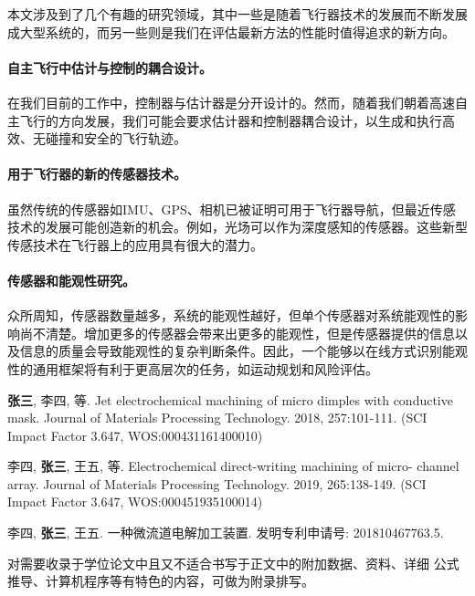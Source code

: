 \documentclass[
  type=master
]{gdutthesis}
\begin{document}
本文涉及到了几个有趣的研究领域，其中一些是随着飞行器技术的发展而不断发展成大型系统的，而另一些则是我们在评估最新方法的性能时值得追求的新方向。
\paragraph{自主飞行中估计与控制的耦合设计。}
在我们目前的工作中，控制器与估计器是分开设计的。然而，随着我们朝着高速自主飞行的方向发展，我们可能会要求估计器和控制器耦合设计，以生成和执行高效、无碰撞和安全的飞行轨迹。
\paragraph{用于飞行器的新的传感器技术。}
虽然传统的传感器如IMU、GPS、相机已被证明可用于飞行器导航，但最近传感技术的发展可能创造新的机会。例如，光场可以作为深度感知的传感器。这些新型传感技术在飞行器上的应用具有很大的潜力。
\paragraph{传感器和能观性研究。}
众所周知，传感器数量越多，系统的能观性越好，但单个传感器对系统能观性的影响尚不清楚。增加更多的传感器会带来出更多的能观性，但是传感器提供的信息以及信息的质量会导致能观性的复杂判断条件。因此，一个能够以在线方式识别能观性的通用框架将有利于更高层次的任务，如运动规划和风险评估。

\nocite{*}%
\printbibliography



\begin{results}
  \item \textbf{张三}, 李四, 等. Jet electrochemical machining of micro dimples with conductive mask.
  Journal of Materials Processing Technology. 2018, 257:101-111. (SCI Impact Factor 3.647,
  WOS:000431161400010)
  \item 李四, \textbf{张三}, 王五, 等. Electrochemical direct-writing machining of micro- channel array.
  Journal of Materials Processing Technology. 2019, 265:138-149. (SCI Impact Factor 3.647,
  WOS:000451935100014)
\end{results}


\begin{results}
  \item 李四, \textbf{张三}, 王五. 一种微流道电解加工装置. 发明专利申请号: 201810467763.5.
\end{results}

\gdutstatement

\zhlipsum[1]

\gdutappendix

对需要收录于学位论文中且又不适合书写于正文中的附加数据、资料、详细
公式推导、计算机程序等有特色的内容，可做为附录排写。
\end{document}
